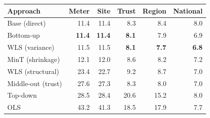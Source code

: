 \begin{tabular}{lrrrrr}
\toprule
Approach & Meter & Site & Trust & Region & National \\
\midrule
Base (direct) & 11.4 & 11.4 & 8.3 & 8.4 & 8.0 \\
\addlinespace[3pt]
Bottom-up & \textbf{11.4} & \textbf{11.4} & \textbf{8.1} & 7.9 & 6.9 \\
WLS (variance) & 11.5 & 11.5 & \textbf{8.1} & \textbf{7.7} & \textbf{6.8} \\
MinT (shrinkage) & 12.1 & 12.0 & 8.6 & 8.2 & 7.2 \\
WLS (structural) & 23.4 & 22.7 & 9.2 & 8.7 & 7.0 \\
Middle-out (trust) & 27.6 & 27.3 & 8.3 & 8.0 & 7.0 \\
Top-down & 28.5 & 28.4 & 20.6 & 15.2 & 8.0 \\
OLS & 43.2 & 41.3 & 18.5 & 17.9 & 7.7 \\
\bottomrule
\end{tabular}
